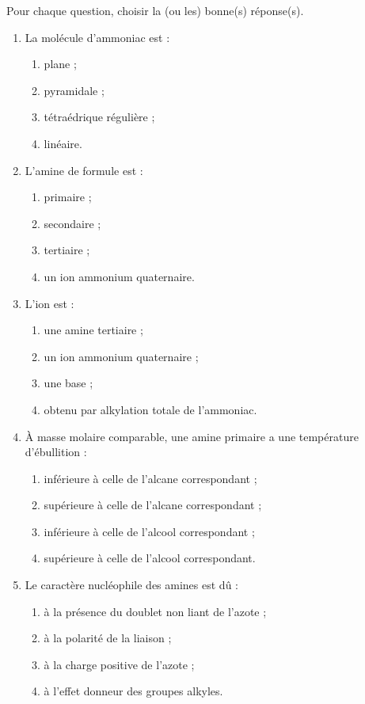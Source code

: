 \documentclass[11pt]{article}
\begin{document}
\begin{exercice}
Pour chaque question, choisir la (ou les) bonne(s) réponse(s).
\begin{enumerate}
\item La molécule d'ammoniac  est :
\begin{enumerate}
\item plane ; \item pyramidale ; \item tétraédrique régulière ; \item linéaire.
\end{enumerate}
\item L'amine de formule  est :
\begin{enumerate}
\item primaire ; \item secondaire ; \item tertiaire ; \item un ion ammonium quaternaire.
\end{enumerate}
\item L'ion  est :
\begin{enumerate}
\item une amine tertiaire ; \item un ion ammonium quaternaire ; \item une base ; \item obtenu par alkylation totale de l'ammoniac.
\end{enumerate}
\item À masse molaire comparable, une amine primaire a une température d'ébullition :
\begin{enumerate}
\item inférieure à celle de l'alcane correspondant ; \item supérieure à celle de l'alcane correspondant ; \item inférieure à celle de l'alcool correspondant ; \item supérieure à celle de l'alcool correspondant.
\end{enumerate}
\item Le caractère nucléophile des amines est dû :
\begin{enumerate}
\item à la présence du doublet non liant de l'azote ; \item à la polarité de la liaison  ; \item à la charge positive de l'azote ; \item à l'effet donneur des groupes alkyles.
\end{enumerate}
\end{enumerate}
\end{exercice}
\end{document}
